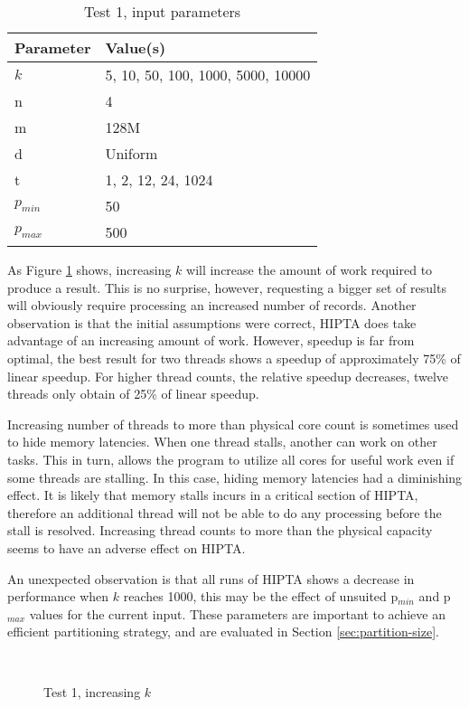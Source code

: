 \begin{table}[H]
	\centering
	\begin{tabular}{|l|l|}
	\hline
	Parameter & Value(s) \\ \hline
	$k$ & 5, 10, 50, 100, 1000, 5000, 10000 \\
	n & 4\\
	m & 128M\\
	d & Uniform\\
	t & 1, 2, 12, 24, 1024\\
	$p_{min}$ & 50\\
	$p_{max}$ & 500 \\
	\hline
	\end{tabular}
	\caption{Test 1, input parameters}
	\label{tab:test1-params}
\end{table}

As Figure \ref{fig:test1} shows, increasing $k$ will increase the amount
of work required to produce a result. This is no surprise, however,
requesting a bigger set of results will obviously require processing
an increased number of records. Another observation is that the
initial assumptions were correct, HIPTA does take advantage of an
increasing amount of work. However, speedup is far from optimal, the
best result for two threads shows a speedup of approximately 75\% of
linear speedup. For higher thread counts, the relative speedup
decreases, twelve threads only obtain of 25\% of linear speedup.

Increasing number of threads to more than physical core count is
sometimes used to hide memory latencies. When one thread stalls,
another can work on other tasks. This in turn, allows the program to
utilize all cores for useful work even if some threads are stalling.
In this case, hiding memory latencies had a diminishing effect. It is
likely that memory stalls incurs in a critical section of HIPTA,
therefore an additional thread will not be able to do any processing
before the stall is resolved. Increasing thread counts to more than
the physical capacity seems to have an adverse effect on HIPTA.

An unexpected observation is that all runs of HIPTA shows a decrease
in performance when $k$ reaches 1000, this may be the effect of unsuited
p$_{min}$ and p$_{max}$ values for the current input. These parameters
are important to achieve an efficient partitioning strategy, and are
evaluated in Section \ref{sec:partition-size}.

\begin{figure}[H]
	\centering
	 \qquad
	 \\
	 \qquad
	\caption{Test 1, increasing $k$}
	\label{fig:test1}
\end{figure}

